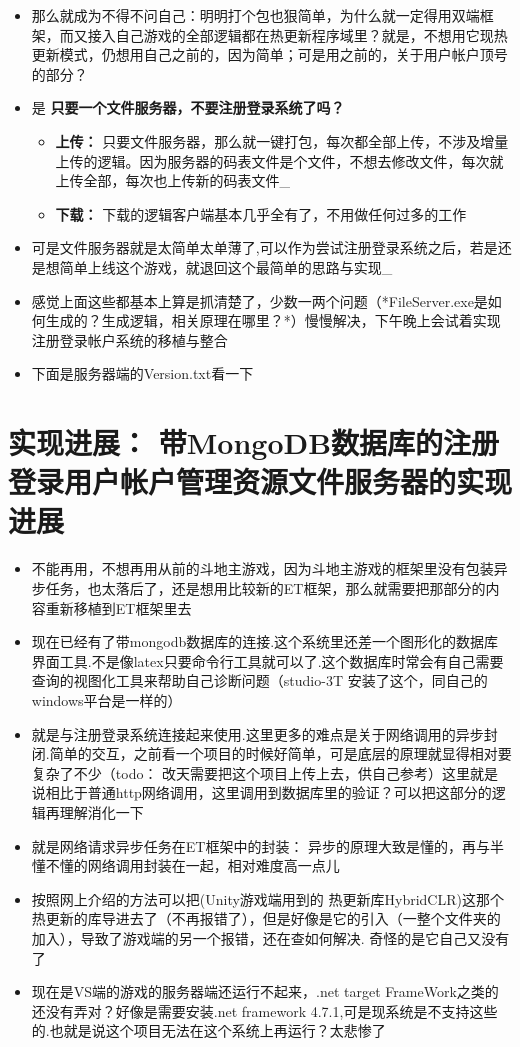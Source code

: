 \documentclass[9pt, b5paper]{article}
\begin{document}
\begin{itemize}
\item 那么就成为不得不问自己：明明打个包也狠简单，为什么就一定得用双端框架，而又接入自己游戏的全部逻辑都在热更新程序域里？就是，不想用它现热更新模式，仍想用自己之前的，因为简单；可是用之前的，关于用户帐户顶号的部分？
\item 是 \textbf{只要一个文件服务器，不要注册登录系统了吗？}
\begin{itemize}
\item \textbf{上传：} 只要文件服务器，那么就一键打包，每次都全部上传，不涉及增量上传的逻辑。因为服务器的码表文件是个文件，不想去修改文件，每次就上传全部，每次也上传新的码表文件\_
\item \textbf{下载：} 下载的逻辑客户端基本几乎全有了，不用做任何过多的工作
\end{itemize}
\item 可是文件服务器就是太简单太单薄了,可以作为尝试注册登录系统之后，若是还是想简单上线这个游戏，就退回这个最简单的思路与实现\_
\item 感觉上面这些都基本上算是抓清楚了，少数一两个问题（*FileServer.exe是如何生成的？生成逻辑，相关原理在哪里？*）慢慢解决，下午晚上会试着实现注册登录帐户系统的移植与整合
\item 下面是服务器端的Version.txt看一下
\end{itemize}
\section{实现进展： 带MongoDB数据库的注册登录用户帐户管理资源文件服务器的实现进展}
\label{sec-6}
\begin{itemize}
\item 不能再用，不想再用从前的斗地主游戏，因为斗地主游戏的框架里没有包装异步任务，也太落后了，还是想用比较新的ET框架，那么就需要把那部分的内容重新移植到ET框架里去
\item 现在已经有了带mongodb数据库的连接.这个系统里还差一个图形化的数据库界面工具.不是像latex只要命令行工具就可以了.这个数据库时常会有自己需要查询的视图化工具来帮助自己诊断问题（studio-3T 安装了这个，同自己的windows平台是一样的）
\item 就是与注册登录系统连接起来使用.这里更多的难点是关于网络调用的异步封闭.简单的交互，之前看一个项目的时候好简单，可是底层的原理就显得相对要复杂了不少（todo： 改天需要把这个项目上传上去，供自己参考）这里就是说相比于普通http网络调用，这里调用到数据库里的验证？可以把这部分的逻辑再理解消化一下
\item 就是网络请求异步任务在ET框架中的封装： 异步的原理大致是懂的，再与半懂不懂的网络调用封装在一起，相对难度高一点儿
\item 按照网上介绍的方法可以把(Unity游戏端用到的 热更新库HybridCLR)这那个热更新的库导进去了（不再报错了），但是好像是它的引入（一整个文件夹的加入），导致了游戏端的另一个报错，还在查如何解决. 奇怪的是它自己又没有了
\item 现在是VS端的游戏的服务器端还运行不起来，.net target FrameWork之类的还没有弄对？好像是需要安装.net framework 4.7.1,可是现系统是不支持这些的.也就是说这个项目无法在这个系统上再运行？太悲惨了
\end{itemize}
\end{document}
